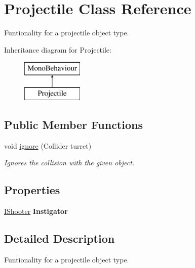 \hypertarget{class_projectile}{}\section{Projectile Class Reference}
\label{class_projectile}


Funtionality for a projectile object type.  


Inheritance diagram for Projectile\+:\begin{figure}[H]
\begin{center}
\leavevmode
\includegraphics[height=2.000000cm]{class_projectile}
\end{center}
\end{figure}
\subsection*{Public Member Functions}
\begin{DoxyCompactItemize}
\item 
void \mbox{\hyperlink{class_projectile_aa7e6481c7c93f758ce91fa04c5d913e0}{ignore}} (Collider turret)
\begin{DoxyCompactList}\small\item\em Ignores the collision with the given object. \end{DoxyCompactList}\end{DoxyCompactItemize}
\subsection*{Properties}
\begin{DoxyCompactItemize}
\item 
\mbox{\label{class_projectile_a88a33f3a39d284c2b8af57fb28e3c0df}} 
\mbox{\hyperlink{interface_i_shooter}{I\+Shooter}} {\bfseries Instigator}
\end{DoxyCompactItemize}


\subsection{Detailed Description}
Funtionality for a projectile object type. 



